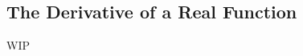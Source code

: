 \documentclass[../poma-notes.tex]{subfiles}
\begin{document}
\subsection*{The Derivative of a Real Function}

WIP
\end{document}
